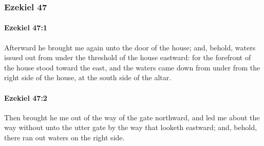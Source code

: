 	\subsubsection{Ezekiel 47} %
		\label{EZEKIEL-47}

		\paragraph{Ezekiel 47:1} %
			\label{EZEKIEL-47-1}

			Afterward he brought me again unto the door of the house; and, behold, waters issued out from under the threshold of the house eastward: for the forefront of the house stood toward the east, and the waters came down from under from the right side of the house, at the south side of the altar.


		\paragraph{Ezekiel 47:2} %
			\label{EZEKIEL-47-2}

			Then brought he me out of the way of the gate northward, and led me about the way without unto the utter gate by the way that looketh eastward; and, behold, there ran out waters on the right side.


